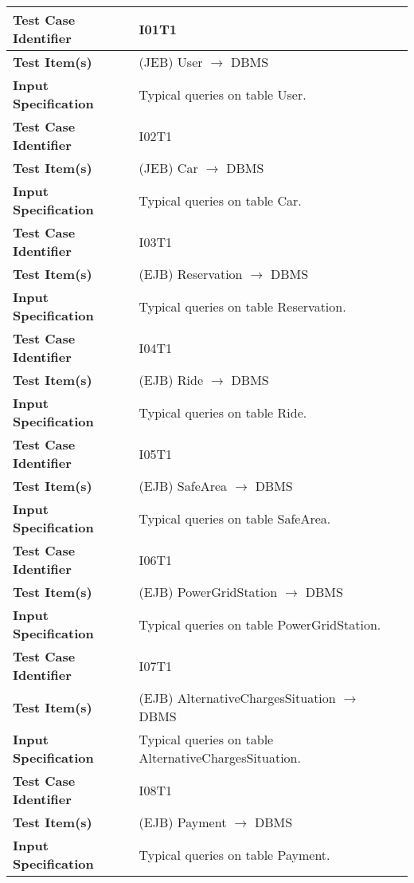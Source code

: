 \begin{longtable}{p{} | p{}}
\hline
\textbf{Test Case Identifier} & I01T1\\
\hline
\textbf{Test Item(s)} & (JEB) User $\rightarrow$ DBMS \\
\hline
\textbf{Input Specification} & Typical queries on table User. \\
\hline
\hline
\textbf{Test Case Identifier} & I02T1\\
\hline
\textbf{Test Item(s)} & (JEB) Car $\rightarrow$ DBMS \\
\hline
\textbf{Input Specification} & Typical queries on table Car. \\
\hline
\hline
\textbf{Test Case Identifier} & I03T1\\
\hline
\textbf{Test Item(s)} & (EJB) Reservation $\rightarrow$ DBMS \\
\hline
\textbf{Input Specification} & Typical queries on table Reservation. \\
\hline
\hline
\textbf{Test Case Identifier} & I04T1\\
\hline
\textbf{Test Item(s)} & (EJB) Ride $\rightarrow$ DBMS \\
\hline
\textbf{Input Specification} & Typical queries on table Ride. \\
\hline
\hline
\textbf{Test Case Identifier} & I05T1\\
\hline
\textbf{Test Item(s)} & (EJB) SafeArea $\rightarrow$ DBMS \\
\hline
\textbf{Input Specification} & Typical queries on table SafeArea. \\
\hline
\hline
\textbf{Test Case Identifier} & I06T1\\
\hline
\textbf{Test Item(s)} & (EJB) PowerGridStation $\rightarrow$ DBMS \\
\hline
\textbf{Input Specification} & Typical queries on table PowerGridStation. \\
\hline
\hline
\textbf{Test Case Identifier} & I07T1\\
\hline
\textbf{Test Item(s)} & (EJB) AlternativeChargesSituation $\rightarrow$ DBMS \\
\hline
\textbf{Input Specification} & Typical queries on table AlternativeChargesSituation. \\
\hline
\hline
\textbf{Test Case Identifier} & I08T1\\
\hline
\textbf{Test Item(s)} & (EJB) Payment $\rightarrow$ DBMS \\
\hline
\textbf{Input Specification} & Typical queries on table Payment. \\

\end{longtable}
